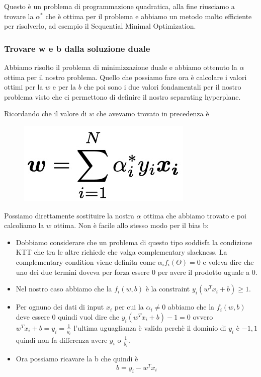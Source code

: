 \documentclass[14pt]{extreport}
\begin{document}
Questo è un problema di programmazione quadratica, alla fine riusciamo a trovare la $\alpha^*$ che è ottima per il problema e abbiamo un metodo molto
efficiente per risolverlo, ad esempio il Sequential Minimal Optimization.

\subsubsection{Trovare w e b dalla soluzione duale}

Abbiamo risolto il problema di minimizzazione duale e abbiamo ottenuto la $\alpha$ ottima per il nostro problema. Quello che possiamo fare ora è
calcolare i valori ottimi per la $w$ e per la $b$ che poi sono i due valori fondamentali per il nostro problema visto che ci permettono di definire il
nostro separating hyperplane.

Ricordando che il valore di $w$ che avevamo trovato in precedenza è \begin{figure}[H]
	\centering
	\includegraphics[width=0.2\linewidth]{319.jpeg}
\end{figure}

Possiamo direttamente sostituire la nostra $\alpha$ ottima che abbiamo trovato e poi calcoliamo la $w$ ottima. Non è facile allo stesso modo per il
bias b:
\begin{itemize}
	\item Dobbiamo considerare che un problema di questo tipo soddisfa la condizione KTT che tra le altre richiede che valga complementary slackness.
	      La complementary condition viene definita come $\alpha_i f_i(\Theta) = 0$ e voleva dire che uno dei due termini doveva per forza essere 0
	      per avere il prodotto uguale a 0.
	\item Nel nostro caso abbiamo che la $f_i(w,b)$ è la constraint $y_i(w^Tx_i+b) \geq 1$.
	\item Per ognuno dei dati di input $x_i$ per cui la $\alpha_i \not = 0$ abbiamo che la $f_i(w,b)$ deve essere 0 quindi vuol dire che
		      $y_i(w^Tx_i+b) - 1=0$ ovvero $w^Tx_i+b = y_i = \frac{1}{y_i}$ l'ultima uguaglianza è valida perchè il dominio di $y_i$ è ${-1,1}$ quindi
		      non fa differenza avere $y_i$ o $\frac{1}{y_i}$.
	\item Ora possiamo ricavare la b che quindi è $$b = y_i-w^T x_i$$
\end{itemize}
\end{document}
